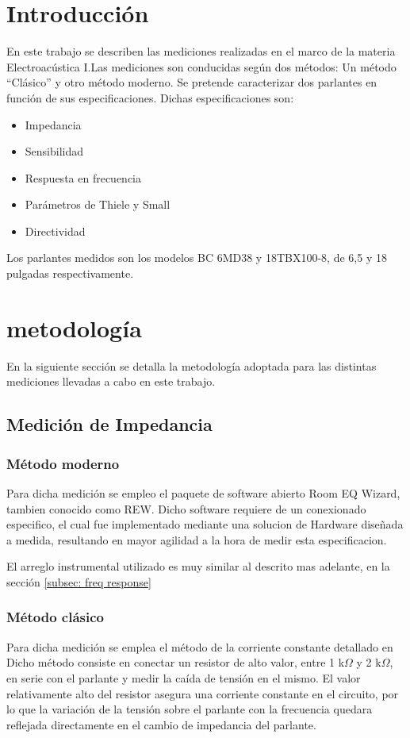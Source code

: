 \documentclass[]{article}
\begin{document}
\begin{multicols}{2}
\section{Introducción}
En este trabajo se describen las mediciones realizadas en el marco de la materia
Electroacústica I.Las mediciones son conducidas según dos métodos: Un método ``Clásico'' y otro método
moderno. Se pretende caracterizar dos parlantes en función de sus especificaciones.
Dichas especificaciones son:
\begin{itemize}
  \item Impedancia
  \item Sensibilidad
  \item Respuesta en frecuencia
  \item Parámetros de Thiele y Small
  \item{Directividad}
\end{itemize}

Los parlantes medidos son los modelos BC 6MD38 y 18TBX100-8, de 6,5 y 18
pulgadas respectivamente.
\section{metodología}
En la siguiente sección se detalla la metodología adoptada para las distintas
mediciones llevadas a cabo en este trabajo.

\subsection{Medición de Impedancia}

\subsubsection{Método moderno}
\label{subsec: z moderno}
Para dicha medición se empleo el paquete de software abierto Room EQ Wizard, tambien
conocido como REW. Dicho software requiere de un conexionado especifico, el cual
fue implementado mediante una solucion de Hardware diseñada a medida, resultando
en mayor agilidad a la hora de medir esta especificacion.

El arreglo instrumental utilizado es muy similar al descrito mas adelante,
en la sección \ref{subsec: freq response}

\subsubsection{Método clásico}
\label{z clasica}
Para dicha medición se emplea el método de la corriente constante detallado en \cite{Ruffa}
Dicho método consiste en conectar un resistor de alto valor, entre 1 k$\Omega$ y
2 k$\Omega$, en serie con el parlante y medir la caída de tensión en el mismo.
El valor relativamente alto del resistor asegura una corriente constante en el
circuito, por lo que la variación de la tensión sobre el parlante con la frecuencia
quedara reflejada directamente en el cambio de impedancia del parlante.


\end{multicols}
\end{document}
